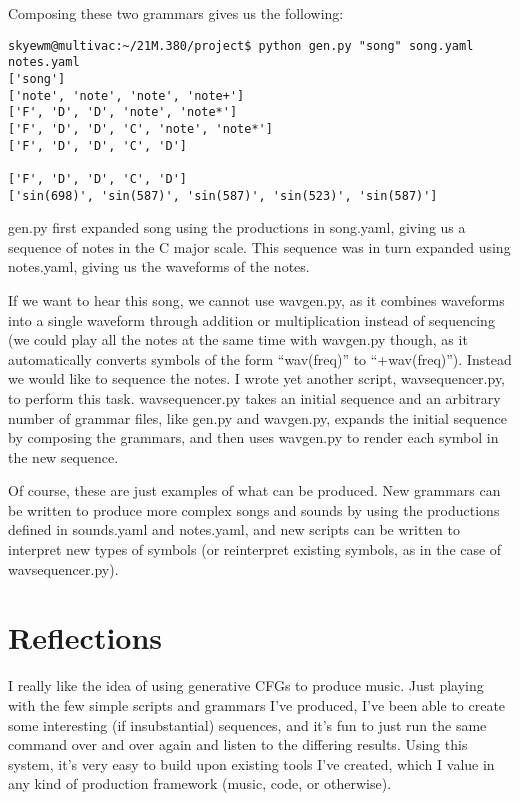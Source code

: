\documentclass[11pt]{article}
\begin{document}
Composing these two grammars gives us the following:
\begin{verbatim}
skyewm@multivac:~/21M.380/project$ python gen.py "song" song.yaml notes.yaml 
['song']
['note', 'note', 'note', 'note+']
['F', 'D', 'D', 'note', 'note*']
['F', 'D', 'D', 'C', 'note', 'note*']
['F', 'D', 'D', 'C', 'D']

['F', 'D', 'D', 'C', 'D']
['sin(698)', 'sin(587)', 'sin(587)', 'sin(523)', 'sin(587)']
\end{verbatim}

gen.py first expanded song using the productions in song.yaml, giving us a
sequence of notes in the C major scale.  This sequence was in turn expanded
using notes.yaml, giving us the waveforms of the notes.

If we want to hear this song, we cannot use wavgen.py, as it combines
waveforms into a single waveform through addition or multiplication instead of
sequencing (we could play all the notes at the same time with wavgen.py
though, as it automatically converts symbols of the form ``wav(freq)'' to
``+wav(freq)'').  Instead we would like to sequence the notes.  I wrote yet
another script, \mbox{wavsequencer.py}, to perform this task.  wavsequencer.py takes
an initial sequence and an arbitrary number of grammar files, like gen.py and
wavgen.py, expands the initial sequence by composing the grammars, and then
uses wavgen.py to render each symbol in the new sequence.

Of course, these are just examples of what can be produced.  New grammars can
be written to produce more complex songs and sounds by using the productions
defined in sounds.yaml and notes.yaml, and new scripts can be written to
interpret new types of symbols (or reinterpret existing symbols, as in the
case of wavsequencer.py).

\section*{Reflections}
I really like the idea of using generative CFGs to produce music.  Just
playing with the few simple scripts and grammars I've produced, I've been able
to create some interesting (if insubstantial) sequences, and it's fun to just
run the same command over and over again and listen to the differing results.
Using this system, it's very easy to build upon existing tools I've created,
which I value in any kind of production framework (music, code, or otherwise).
\end{document}
